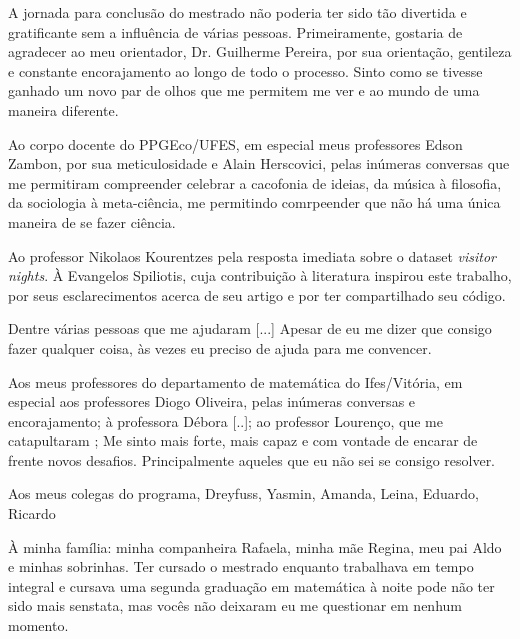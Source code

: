 \begin{agradecimentos}
  A jornada para conclusão do mestrado não poderia ter sido tão divertida e gratificante sem a influência de várias pessoas. Primeiramente, gostaria de agradecer ao meu orientador, Dr. Guilherme Pereira, por sua orientação, gentileza e constante encorajamento ao longo de todo o processo. Sinto como se tivesse ganhado um novo par de olhos que me permitem me ver e ao mundo de uma maneira diferente.

  Ao corpo docente do PPGEco/UFES, em especial meus professores Edson Zambon, por sua meticulosidade e Alain Herscovici, pelas inúmeras conversas que me permitiram compreender celebrar a cacofonia de ideias, da música à filosofia, da sociologia à meta-ciência, me permitindo comrpeender que não há uma única maneira de se fazer ciência.

  Ao professor Nikolaos Kourentzes pela resposta imediata sobre o dataset \textit{visitor nights}. À Evangelos Spiliotis, cuja contribuição à literatura inspirou este trabalho, por seus esclarecimentos acerca de seu artigo e por ter compartilhado seu código.
  
  Dentre várias pessoas que me ajudaram [...] Apesar de eu me dizer que consigo fazer qualquer coisa, às vezes eu preciso de ajuda para me convencer.

  Aos meus professores do departamento de matemática do Ifes/Vitória, em especial aos professores Diogo Oliveira, pelas inúmeras conversas e encorajamento; à professora Débora [..]; ao professor Lourenço, que me catapultaram ; Me sinto mais forte, mais capaz e com vontade de encarar de frente novos desafios. Principalmente aqueles que eu não sei se consigo resolver.

  Aos meus colegas do programa, Dreyfuss, Yasmin, Amanda, Leina, Eduardo, Ricardo 

  À minha família: minha companheira Rafaela, minha mãe Regina, meu pai Aldo e minhas sobrinhas. Ter cursado o mestrado enquanto trabalhava em tempo integral e cursava uma segunda graduação em matemática à noite pode não ter sido mais senstata, mas vocês não deixaram eu me questionar em nenhum momento.
\end{agradecimentos}


